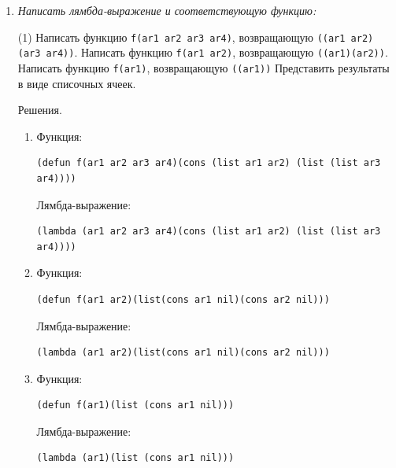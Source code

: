 \begin{enumerate}[wide=0pt]
\begin{enumerate}[label=\arabic*)]
	\item \lstinline{(T Nil)}
	\item \lstinline{(NIL T)}
	\item \lstinline{(T NIL)}
	\item \lstinline{((T) Nil)}
	\item \lstinline{((ONE TWO) FREE TEMP)}
\end{enumerate}
\item \textit{Написать лямбда-выражение и соответствующую функцию:}
\begin{tasks}[label=\arabic*), item-indent=3pt, label-offset=10pt, after-item-skip=1pt](1)
	\task Написать функцию \lstinline{f(ar1 ar2 ar3 ar4)}, возвращающую \lstinline{((ar1 ar2) (ar3 ar4))}.
	\task Написать функцию \lstinline{f(ar1 ar2)}, возвращающую \lstinline{((ar1)(ar2))}.
	\task Написать функцию \lstinline{f(ar1)}, возвращающую \lstinline{((ar1))}
	\task[~] Представить результаты в виде списочных ячеек.
\end{tasks}
Решения.
\begin{enumerate}[label=\arabic*.,wide=0pt]
\item Функция:
\begin{lstlisting}
(defun f(ar1 ar2 ar3 ar4)(cons (list ar1 ar2) (list (list ar3 ar4))))
\end{lstlisting}
Лямбда-выражение:
\begin{lstlisting}
(lambda (ar1 ar2 ar3 ar4)(cons (list ar1 ar2) (list (list ar3 ar4))))
\end{lstlisting}
\item  Функция:
\begin{lstlisting}
(defun f(ar1 ar2)(list(cons ar1 nil)(cons ar2 nil)))
\end{lstlisting}
Лямбда-выражение:
\begin{lstlisting}
(lambda (ar1 ar2)(list(cons ar1 nil)(cons ar2 nil)))
\end{lstlisting}
\item  Функция:
\begin{lstlisting}
(defun f(ar1)(list (cons ar1 nil)))
\end{lstlisting}
Лямбда-выражение:
\begin{lstlisting}
(lambda (ar1)(list (cons ar1 nil)))
\end{lstlisting}
\end{enumerate}



\end{enumerate}

